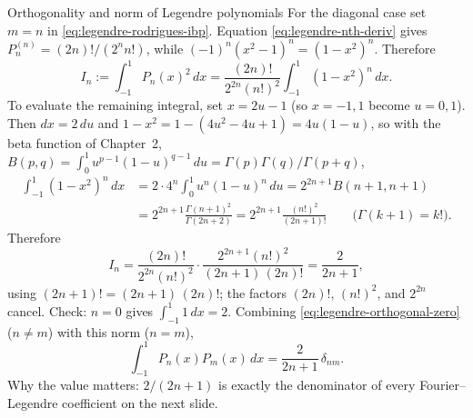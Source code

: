 \documentclass[11pt]{beamer}
\begin{document}
\begin{frame}[allowframebreaks=1.00]{Orthogonality and norm of Legendre polynomials}
For the diagonal case set $m=n$ in \eqref{eq:legendre-rodrigues-ibp}. Equation
\eqref{eq:legendre-nth-deriv} gives $P_n^{(n)}=(2n)!/(2^n n!)$, while
$(-1)^n(x^2-1)^n=(1-x^2)^n$. Therefore
\begin{equation}
 I_n:=\int_{-1}^{1}P_n(x)^2\,dx
 =\frac{(2n)!}{2^{2n}(n!)^2}\int_{-1}^{1}(1-x^2)^n\,dx.
 \label{eq:legendre-norm-ibp}
\end{equation}
To evaluate the remaining integral, set $x=2u-1$ (so $x=-1,1$ become $u=0,1$). Then $dx=2\,du$ and
$1-x^2=1-(4u^2-4u+1)=4u(1-u)$, so with the beta function of Chapter~2,
$B(p,q)=\int_0^1u^{p-1}(1-u)^{q-1}\,du=\Gamma(p)\Gamma(q)/\Gamma(p+q)$,
\begin{align*}
  \int_{-1}^{1}(1-x^2)^n\,dx
  &=2\cdot4^n\int_0^1u^n(1-u)^n\,du
  =2^{2n+1}B(n+1,n+1)\\
  &=2^{2n+1}\frac{\Gamma(n+1)^2}{\Gamma(2n+2)}
  =2^{2n+1}\frac{(n!)^2}{(2n+1)!}
  \qquad\bigl(\Gamma(k+1)=k!\bigr).
\end{align*}
Therefore
\[
  I_n
  =\frac{(2n)!}{2^{2n}(n!)^2}
    \cdot\frac{2^{2n+1}(n!)^2}{(2n+1)\,(2n)!}
  =\frac{2}{2n+1},
\]
using $(2n+1)!=(2n+1)\,(2n)!$; the factors $(2n)!$, $(n!)^2$, and $2^{2n}$ cancel.
Check: $n=0$ gives $\int_{-1}^1 1\,dx=2$.
Combining \eqref{eq:legendre-orthogonal-zero} ($n\ne m$) with this norm ($n=m$),
\begin{equation}
  \int_{-1}^{1}P_n(x)P_m(x)\,dx
  =\frac{2}{2n+1}\,\delta_{nm}.
  \label{eq:legendre-orthogonality-full}
\end{equation}
Why the value matters: $2/(2n+1)$ is exactly the denominator of every
Fourier--Legendre coefficient on the next slide.
\end{frame}
\end{document}
